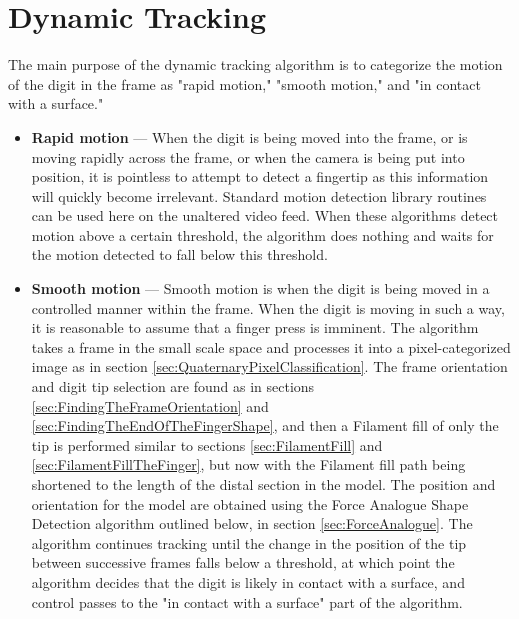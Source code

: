 \clearpage
\section{Dynamic Tracking}\label{sec:DynamicTracking}
The main purpose of the dynamic tracking algorithm is to categorize the motion of the digit in the frame as "rapid motion," "smooth motion," and "in contact with a surface."

\begin{itemize}
\item \textbf{Rapid motion} --- When the digit is being moved into the frame, or is moving rapidly across the frame, or when the camera is being put into position, it is pointless to attempt to detect a fingertip as this information will quickly become irrelevant. Standard motion detection library routines can be used here on the unaltered video feed. When these algorithms detect motion above a certain threshold, the algorithm does nothing and waits for the motion detected to fall below this threshold.
\item \textbf{Smooth motion} --- Smooth motion is when the digit is being moved in a controlled manner within the frame. When the digit is moving in such a way, it is reasonable to assume that a finger press is imminent. The algorithm takes a frame in the small scale space and processes it into a pixel-categorized image as in section \ref{sec:QuaternaryPixelClassification}. The frame orientation and digit tip selection are found as in sections \ref{sec:FindingTheFrameOrientation} and \ref{sec:FindingTheEndOfTheFingerShape}, and then a Filament fill of only the tip is performed similar to sections \ref{sec:FilamentFill} and \ref{sec:FilamentFillTheFinger}, but now with the Filament fill path being shortened to the length of the distal section in the model. The position and orientation for the model are obtained using the Force Analogue Shape Detection algorithm outlined below, in section \ref{sec:ForceAnalogue}. The algorithm continues tracking until the change in the position of the tip between successive frames falls below a threshold, at which point the algorithm decides that the digit is likely in contact with a surface, and control passes to the "in contact with a surface" part of the algorithm.

\end{itemize}
